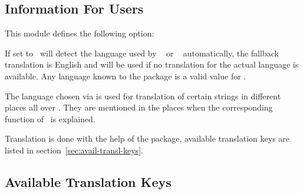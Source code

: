 \documentclass{chemmacros-manual}
\begin{document}
\subsection{Information For Users}\label{sec:information-users}

This module defines the following option:
\begin{options}
    If set to  \chemmacros\ will detect the language used by
    ~\cite{pkg:babel} or ~\cite{pkg:polyglossia}
    automatically, the fallback translation is English and will be used if no 
    translation for the actual language is available.  Any language known to
    the  package is a valid value for .
\end{options}

The language chosen via  is used for translation of certain
strings in different places all over \chemmacros.  They are mentioned in the
places when the corresponding function of \chemmacros\ is explained.

Translation is done with the help of the  package, available
translation keys are listed in section~\vref{sec:avail-transl-keys}.

\subsection{Available Translation Keys}\label{sec:avail-transl-keys}
\end{document}
